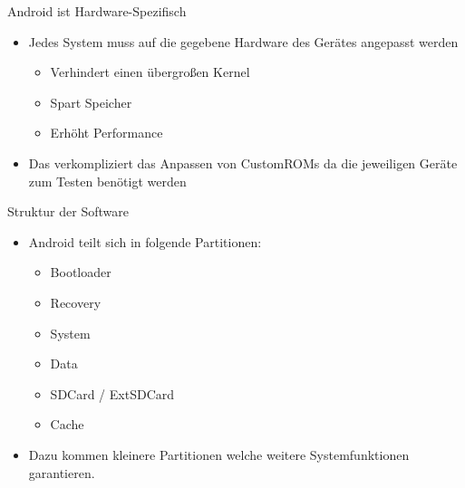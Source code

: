 \begin{frame}{Android ist Hardware-Spezifisch}
	\begin{itemize}
		\item Jedes System muss auf die gegebene Hardware des Gerätes angepasst werden
		\begin{itemize}
			\item Verhindert einen übergroßen Kernel
			\item Spart Speicher
			\item Erhöht Performance
		\end{itemize}
		\item Das verkompliziert das Anpassen von CustomROMs da die jeweiligen Geräte zum Testen benötigt werden
	\end{itemize}
\end{frame}

\begin{frame}{Struktur der Software}
	\begin{itemize}[<+->]
		\item Android teilt sich in folgende Partitionen:
		\begin{itemize}[<+->]
			\item Bootloader 
			\item Recovery
			\item System
			\item Data
			\item SDCard / ExtSDCard
			\item Cache
		\end{itemize}
		\item Dazu kommen kleinere Partitionen welche weitere Systemfunktionen garantieren.
	\end{itemize}
\end{frame}